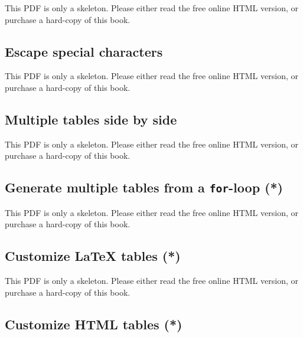 \documentclass[
  11pt,
]{krantz}
\begin{document}
This PDF is only a skeleton. Please either read the free online HTML version, or purchase a hard-copy of this book.

\subsection{Escape special characters}\label{escape-special-characters}

This PDF is only a skeleton. Please either read the free online HTML version, or purchase a hard-copy of this book.

\subsection{Multiple tables side by side}\label{multiple-tables-side-by-side}

This PDF is only a skeleton. Please either read the free online HTML version, or purchase a hard-copy of this book.

\begin{table}\caption{\label{tab:two-tables}Two tables placed side by side.}\end{table}

\begin{table}\caption{\label{tab:kables}Two tables created by knitr::kables().}\end{table}

\subsection{\texorpdfstring{Generate multiple tables from a \texttt{for}-loop (*)}{Generate multiple tables from a for-loop (*)}}\label{generate-multiple-tables-from-a-for-loop}

This PDF is only a skeleton. Please either read the free online HTML version, or purchase a hard-copy of this book.

\subsection{Customize LaTeX tables (*)}\label{customize-latex-tables}

This PDF is only a skeleton. Please either read the free online HTML version, or purchase a hard-copy of this book.

\subsection{Customize HTML tables (*)}\label{customize-html-tables}
\end{document}
